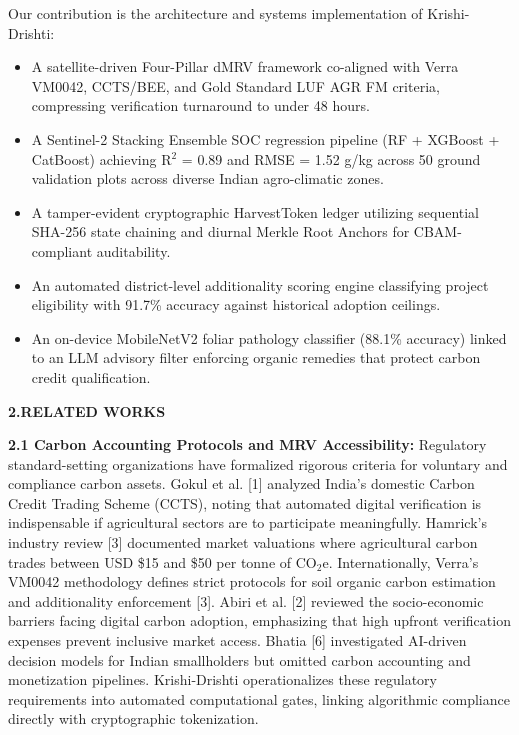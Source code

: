 \documentclass[11pt,a4paper]{article}
\begin{document}
Our contribution is the architecture and systems implementation of Krishi-Drishti:
\begin{itemize}[noitemsep,topsep=2pt]
    \item A satellite-driven Four-Pillar dMRV framework co-aligned with Verra VM0042, CCTS/BEE, and Gold Standard LUF AGR FM criteria, compressing verification turnaround to under 48 hours.
    \item A Sentinel-2 Stacking Ensemble SOC regression pipeline (RF + XGBoost + CatBoost) achieving R$^2$ = 0.89 and RMSE = 1.52 g/kg across 50 ground validation plots across diverse Indian agro-climatic zones.
    \item A tamper-evident cryptographic HarvestToken ledger utilizing sequential SHA-256 state chaining and diurnal Merkle Root Anchors for CBAM-compliant auditability.
    \item An automated district-level additionality scoring engine classifying project eligibility with 91.7\% accuracy against historical adoption ceilings.
    \item An on-device MobileNetV2 foliar pathology classifier (88.1\% accuracy) linked to an LLM advisory filter enforcing organic remedies that protect carbon credit qualification.
\end{itemize}
\vspace{1.2em}

\noindent \textbf{\large 2.RELATED WORKS}
\vspace{0.5em}

\noindent \textbf{2.1 Carbon Accounting Protocols and MRV Accessibility:} 
Regulatory standard-setting organizations have formalized rigorous criteria for voluntary and compliance carbon assets. Gokul et al. [1] analyzed India's domestic Carbon Credit Trading Scheme (CCTS), noting that automated digital verification is indispensable if agricultural sectors are to participate meaningfully. Hamrick's industry review [3] documented market valuations where agricultural carbon trades between USD \$15 and \$50 per tonne of CO$_2$e. Internationally, Verra's VM0042 methodology defines strict protocols for soil organic carbon estimation and additionality enforcement [3]. Abiri et al. [2] reviewed the socio-economic barriers facing digital carbon adoption, emphasizing that high upfront verification expenses prevent inclusive market access. Bhatia [6] investigated AI-driven decision models for Indian smallholders but omitted carbon accounting and monetization pipelines. Krishi-Drishti operationalizes these regulatory requirements into automated computational gates, linking algorithmic compliance directly with cryptographic tokenization.
\end{document}
